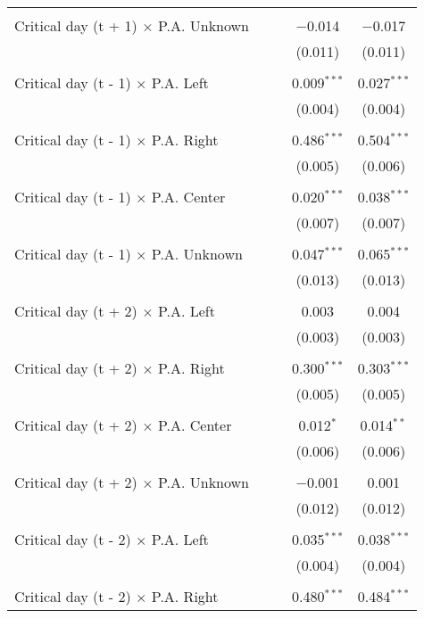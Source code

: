 \documentclass[
]{article}
\begin{document}
\begin{table}[!htbp]
{\begin{tabular}{@{\extracolsep{5pt}}lcccc}
  & & & & \\ 
 Critical day (t + 1) $\times$ P.A. Unknown &  &  & $-$0.014 & $-$0.017 \\ 
  &  &  & (0.011) & (0.011) \\ 
  & & & & \\ 
 Critical day (t - 1) $\times$ P.A. Left &  &  & 0.009$^{***}$ & 0.027$^{***}$ \\ 
  &  &  & (0.004) & (0.004) \\ 
  & & & & \\ 
 Critical day (t - 1) $\times$ P.A. Right &  &  & 0.486$^{***}$ & 0.504$^{***}$ \\ 
  &  &  & (0.005) & (0.006) \\ 
  & & & & \\ 
 Critical day (t - 1) $\times$ P.A. Center &  &  & 0.020$^{***}$ & 0.038$^{***}$ \\ 
  &  &  & (0.007) & (0.007) \\ 
  & & & & \\ 
 Critical day (t - 1) $\times$ P.A. Unknown &  &  & 0.047$^{***}$ & 0.065$^{***}$ \\ 
  &  &  & (0.013) & (0.013) \\ 
  & & & & \\ 
 Critical day (t + 2) $\times$ P.A. Left &  &  & 0.003 & 0.004 \\ 
  &  &  & (0.003) & (0.003) \\ 
  & & & & \\ 
 Critical day (t + 2) $\times$ P.A. Right &  &  & 0.300$^{***}$ & 0.303$^{***}$ \\ 
  &  &  & (0.005) & (0.005) \\ 
  & & & & \\ 
 Critical day (t + 2) $\times$ P.A. Center &  &  & 0.012$^{*}$ & 0.014$^{**}$ \\ 
  &  &  & (0.006) & (0.006) \\ 
  & & & & \\ 
 Critical day (t + 2) $\times$ P.A. Unknown &  &  & $-$0.001 & 0.001 \\ 
  &  &  & (0.012) & (0.012) \\ 
  & & & & \\ 
 Critical day (t - 2) $\times$ P.A. Left &  &  & 0.035$^{***}$ & 0.038$^{***}$ \\ 
  &  &  & (0.004) & (0.004) \\ 
  & & & & \\ 
 Critical day (t - 2) $\times$ P.A. Right &  &  & 0.480$^{***}$ & 0.484$^{***}$ \\ 

\end{tabular}}
\end{table}
\end{document}
